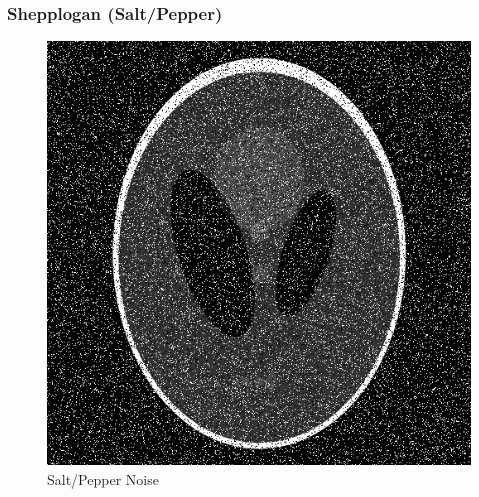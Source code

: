\documentclass{article}
\begin{document}
    \subsubsection*{Shepplogan (Salt/Pepper)}
    
    \begin{figure}[!htb]
    \begin{center}
     \includegraphics[scale=.3]{./basic_denoising/shepplogan/sp.png}
     \caption{Salt/Pepper Noise}
    \end{center}
    \end{figure}
    
\end{document}

